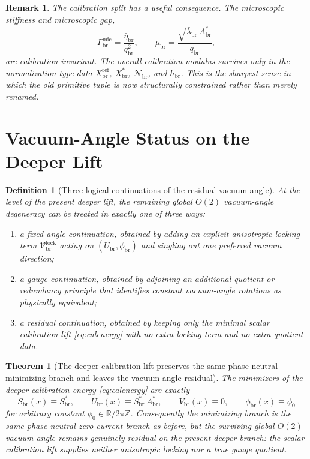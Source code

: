\documentclass[11pt]{article}
\newcommand{\RespNorm}{\mathcal N_{\mathrm{br}}}
\newcommand{\RespBias}{h_{\mathrm{br}}}
\newcommand{\RespMicroEq}{X_{\mathrm{br}}^{\ast}}
\newcommand{\RespMicroRef}{X_{\mathrm{br}}^{\mathrm{ref}}}
\newcommand{\RespMicroFluxCoeff}{\Gamma_{\mathrm{br}}^{\mathrm{mic}}}
\newcommand{\RespMicroGap}{\mu_{\mathrm{br}}}
\newcommand{\RespVacAmp}{U_{\mathrm{br}}}
\newcommand{\RespVacPhase}{\phi_{\mathrm{br}}}
\newcommand{\RespVacCarrier}{V_{\mathrm{br}}}
\newcommand{\RespVacLock}{\mathscr V_{\mathrm{br}}^{\mathrm{lock}}}
\newcommand{\RespScaleField}{S_{\mathrm{br}}}
\newcommand{\RespScaleEq}{S_{\mathrm{br}}^{\ast}}
\newcommand{\RespScaleAmpEq}{A_{\mathrm{br}}^{\ast}}
\newcommand{\RespScaleReadout}{\bar q_{\mathrm{br}}}
\newcommand{\RespScaleWell}{\bar\lambda_{\mathrm{br}}}
\newcommand{\RespScaleIso}{\bar\eta_{\mathrm{br}}}
\newtheorem{definition}{Definition}
\newtheorem{remark}{Remark}
\newtheorem{theorem}{Theorem}
\begin{document}
\begin{remark}
The calibration split has a useful consequence. The microscopic stiffness and microscopic gap,
\[
\RespMicroFluxCoeff=\frac{\RespScaleIso}{\RespScaleReadout^2},
\qquad
\RespMicroGap=\frac{\sqrt{\RespScaleWell}\,\RespScaleAmpEq}{\RespScaleReadout},
\]
are calibration-invariant. The overall calibration modulus survives only in the normalization-type data \(\RespMicroRef\), \(\RespMicroEq\), \(\RespNorm\), and \(\RespBias\). This is the sharpest sense in which the old primitive tuple is now structurally constrained rather than merely renamed.
\end{remark}

\section{Vacuum-Angle Status on the Deeper Lift}

\begin{definition}[Three logical continuations of the residual vacuum angle]
\label{def:vactrichotomy}
At the level of the present deeper lift, the remaining global \(O(2)\) vacuum-angle degeneracy can be treated in exactly one of three ways:
\begin{enumerate}
    \item a \emph{fixed-angle continuation}, obtained by adding an explicit anisotropic locking term \(\RespVacLock\) acting on \((\RespVacAmp,\RespVacPhase)\) and singling out one preferred vacuum direction;
    \item a \emph{gauge continuation}, obtained by adjoining an additional quotient or redundancy principle that identifies constant vacuum-angle rotations as physically equivalent;
    \item a \emph{residual continuation}, obtained by keeping only the minimal scalar calibration lift \eqref{eq:calenergy} with no extra locking term and no extra quotient data.
\end{enumerate}
\end{definition}

\begin{theorem}[The deeper calibration lift preserves the same phase-neutral minimizing branch and leaves the vacuum angle residual]
\label{thm:residualangle}
The minimizers of the deeper calibration energy \eqref{eq:calenergy} are exactly
\begin{equation}
\RespScaleField(x)\equiv \RespScaleEq,
\qquad
\RespVacAmp(x)\equiv \RespScaleEq\,\RespScaleAmpEq,
\qquad
\RespVacCarrier(x)\equiv0,
\qquad
\RespVacPhase(x)\equiv \phi_0
\label{eq:calminimizers}
\end{equation}
for arbitrary constant \(\phi_0\in\mathbb R/2\pi\mathbb Z\). Consequently the minimizing branch is the same phase-neutral zero-current branch as before, but the surviving global \(O(2)\) vacuum angle remains genuinely residual on the present deeper branch: the scalar calibration lift supplies neither anisotropic locking nor a true gauge quotient.
\end{theorem}
\end{document}
